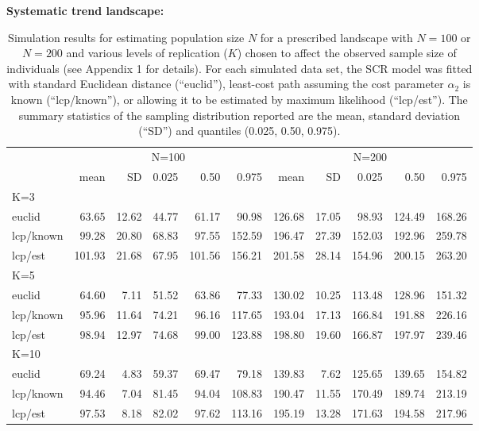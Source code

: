 \documentclass[12pt]{article}
\begin{document}
\begin{table}[h!]
{\small
\caption{Simulation results for estimating population size $N$ for a
  prescribed landscape with
$N=100$ or $N=200$ and various levels of replication ($K$) chosen to affect the observed sample
size of individuals (see Appendix 1 for details). For each simulated data set, the SCR model was fitted with
standard Euclidean distance (``euclid''), least-cost path assuming the
cost parameter $\alpha_2$ is known (``lcp/known''), or allowing it to
be estimated by maximum likelihood (``lcp/est'').
The summary statistics of the
sampling distribution reported are the mean, standard deviation
(``SD'') and quantiles (0.025, 0.50, 0.975).
}
{\bf Systematic trend landscape:} \\
\begin{tabular}{l|rrrrr|rrrrr}
         & \multicolumn{5}{c}{N=100   } & \multicolumn{5}{c}{N=200  }  \\
         &   mean &  SD  & 0.025 & 0.50 & 0.975  & mean  & SD   & 0.025 & 0.50  & 0.975 \\ \hline
K=3      &        &      &       &      &        &       &      &       &       &       \\
euclid   &   63.65& 12.62& 44.77 & 61.17&  90.98 & 126.68& 17.05&  98.93& 124.49& 168.26 \\
lcp/known&   99.28& 20.80& 68.83 & 97.55& 152.59 & 196.47& 27.39& 152.03& 192.96& 259.78\\
lcp/est  &  101.93& 21.68& 67.95 &101.56& 156.21 & 201.58& 28.14& 154.96& 200.15& 263.20\\
K=5      &        &      &       &      &        &       &      &       &       &        \\
euclid   &  64.60 & 7.11 & 51.52 & 63.86&  77.33 & 130.02& 10.25& 113.48& 128.96& 151.32\\
lcp/known&  95.96 &11.64 & 74.21 & 96.16& 117.65 & 193.04& 17.13& 166.84& 191.88& 226.16\\
lcp/est  &  98.94 &12.97 & 74.68 & 99.00& 123.88 & 198.80& 19.60& 166.87& 197.97& 239.46\\
K=10     &        &      &       &      &        &       &      &       &       &       \\
euclid   &  69.24 & 4.83 & 59.37 & 69.47&  79.18 & 139.83&  7.62& 125.65& 139.65& 154.82\\
lcp/known&  94.46 & 7.04 & 81.45 & 94.04& 108.83 & 190.47& 11.55& 170.49& 189.74& 213.19\\
lcp/est  &  97.53 & 8.18 & 82.02 & 97.62& 113.16 & 195.19& 13.28& 171.63& 194.58& 217.96\\ \hline

\end{tabular}}
\end{table}
\end{document}
